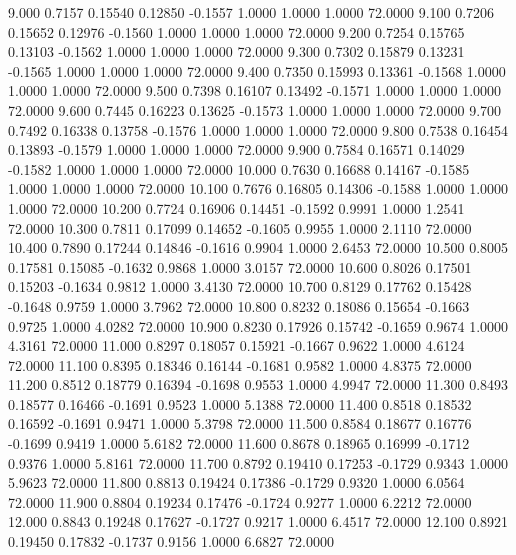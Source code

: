    9.000   0.7157   0.15540   0.12850  -0.1557   1.0000   1.0000   1.0000  72.0000
   9.100   0.7206   0.15652   0.12976  -0.1560   1.0000   1.0000   1.0000  72.0000
   9.200   0.7254   0.15765   0.13103  -0.1562   1.0000   1.0000   1.0000  72.0000
   9.300   0.7302   0.15879   0.13231  -0.1565   1.0000   1.0000   1.0000  72.0000
   9.400   0.7350   0.15993   0.13361  -0.1568   1.0000   1.0000   1.0000  72.0000
   9.500   0.7398   0.16107   0.13492  -0.1571   1.0000   1.0000   1.0000  72.0000
   9.600   0.7445   0.16223   0.13625  -0.1573   1.0000   1.0000   1.0000  72.0000
   9.700   0.7492   0.16338   0.13758  -0.1576   1.0000   1.0000   1.0000  72.0000
   9.800   0.7538   0.16454   0.13893  -0.1579   1.0000   1.0000   1.0000  72.0000
   9.900   0.7584   0.16571   0.14029  -0.1582   1.0000   1.0000   1.0000  72.0000
  10.000   0.7630   0.16688   0.14167  -0.1585   1.0000   1.0000   1.0000  72.0000
  10.100   0.7676   0.16805   0.14306  -0.1588   1.0000   1.0000   1.0000  72.0000
  10.200   0.7724   0.16906   0.14451  -0.1592   0.9991   1.0000   1.2541  72.0000
  10.300   0.7811   0.17099   0.14652  -0.1605   0.9955   1.0000   2.1110  72.0000
  10.400   0.7890   0.17244   0.14846  -0.1616   0.9904   1.0000   2.6453  72.0000
  10.500   0.8005   0.17581   0.15085  -0.1632   0.9868   1.0000   3.0157  72.0000
  10.600   0.8026   0.17501   0.15203  -0.1634   0.9812   1.0000   3.4130  72.0000
  10.700   0.8129   0.17762   0.15428  -0.1648   0.9759   1.0000   3.7962  72.0000
  10.800   0.8232   0.18086   0.15654  -0.1663   0.9725   1.0000   4.0282  72.0000
  10.900   0.8230   0.17926   0.15742  -0.1659   0.9674   1.0000   4.3161  72.0000
  11.000   0.8297   0.18057   0.15921  -0.1667   0.9622   1.0000   4.6124  72.0000
  11.100   0.8395   0.18346   0.16144  -0.1681   0.9582   1.0000   4.8375  72.0000
  11.200   0.8512   0.18779   0.16394  -0.1698   0.9553   1.0000   4.9947  72.0000
  11.300   0.8493   0.18577   0.16466  -0.1691   0.9523   1.0000   5.1388  72.0000
  11.400   0.8518   0.18532   0.16592  -0.1691   0.9471   1.0000   5.3798  72.0000
  11.500   0.8584   0.18677   0.16776  -0.1699   0.9419   1.0000   5.6182  72.0000
  11.600   0.8678   0.18965   0.16999  -0.1712   0.9376   1.0000   5.8161  72.0000
  11.700   0.8792   0.19410   0.17253  -0.1729   0.9343   1.0000   5.9623  72.0000
  11.800   0.8813   0.19424   0.17386  -0.1729   0.9320   1.0000   6.0564  72.0000
  11.900   0.8804   0.19234   0.17476  -0.1724   0.9277   1.0000   6.2212  72.0000
  12.000   0.8843   0.19248   0.17627  -0.1727   0.9217   1.0000   6.4517  72.0000
  12.100   0.8921   0.19450   0.17832  -0.1737   0.9156   1.0000   6.6827  72.0000
